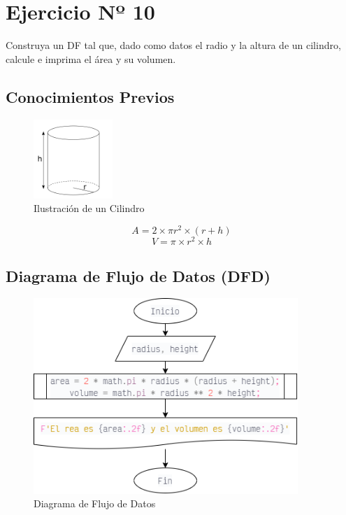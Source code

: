 \section{Ejercicio Nº 10}
Construya un DF tal que, dado como datos el radio y la altura de un cilindro,
calcule e imprima el área y su volumen.
\subsection{Conocimientos Previos}
\begin{multicols}{2}
	\begin{figure}[H]
		\centering
		\includegraphics[width=3cm]{Images/img3.png}
		\caption{Ilustración de un Cilindro}\label{fig:fg4}
	\end{figure}
	\[A = 2\times\pi {r}^2\times (r + h)\]
	\[V = \pi\times {r}^2\times h\]
\end{multicols}
\subsection{Diagrama de Flujo de Datos (DFD)}
\begin{figure}[H]
	\centering
	\includegraphics[width=10cm]{Images/ex10.png}
	\caption{Diagrama de Flujo de Datos}\label{fig:fg5}
\end{figure}
